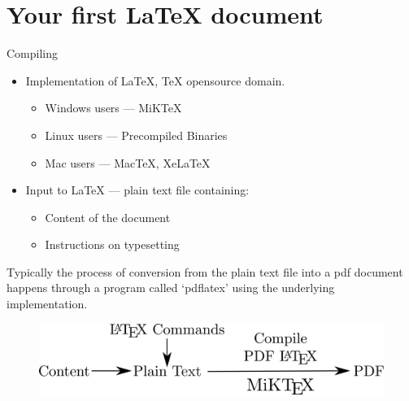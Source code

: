\documentclass{beamer}
\begin{document}
\section{Your first \LaTeX{} document}

\begin{frame}[fragile]{Compiling}

\begin{itemize}
  \item Implementation of \LaTeX{}, \TeX{} opensource domain. 
  \begin{itemize}
  \item Windows users --- MiK\TeX 
  \item Linux users --- Precompiled Binaries
  \item Mac users --- Mac\TeX{}, Xe\LaTeX
  \end{itemize}
\end{itemize}
\pause
\begin{itemize}
 \item Input to \LaTeX{} --- plain text file containing:
 \begin{itemize}
 \item Content of the document
 \item Instructions on typesetting
 \end{itemize}
\end{itemize}
\pause
Typically the process of conversion from the plain text file into a pdf 
document happens through a program called `pdflatex' using the underlying 
implementation.
 \pause
 \begin{figure}
  \centering
  \includegraphics[scale=0.4]{pics/Compiling.png}
 \end{figure}
\end{frame}
\end{document}

